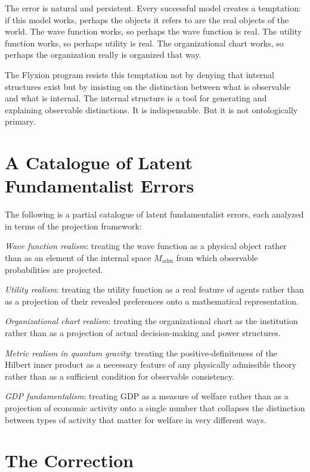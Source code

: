 \documentclass[12pt,a4paper]{book}
\theoremstyle{remark}
\theoremstyle{definition}
\begin{document}
The error is natural and persistent. Every successful model creates a
temptation: if this model works, perhaps the objects it refers to are
the real objects of the world. The wave function works, so perhaps the
wave function is real. The utility function works, so perhaps utility is
real. The organizational chart works, so perhaps the organization really
is organized that way.

The Flyxion program resists this temptation not by denying that internal
structures exist but by insisting on the distinction between what is
observable and what is internal. The internal structure is a tool for
generating and explaining observable distinctions. It is indispensable.
But it is not ontologically primary.

\section{A Catalogue of Latent Fundamentalist Errors}

The following is a partial catalogue of latent fundamentalist errors,
each analyzed in terms of the projection framework:

\textit{Wave function realism}: treating the wave function as a physical
object rather than as an element of the internal space $M_{\mathrm{adm}}$
from which observable probabilities are projected.

\textit{Utility realism}: treating the utility function as a real feature
of agents rather than as a projection of their revealed preferences onto
a mathematical representation.

\textit{Organizational chart realism}: treating the organizational chart
as the institution rather than as a projection of actual decision-making
and power structures.

\textit{Metric realism in quantum gravity}: treating the positive-definiteness
of the Hilbert inner product as a necessary feature of any physically
admissible theory rather than as a sufficient condition for observable
consistency.

\textit{GDP fundamentalism}: treating GDP as a measure of welfare rather
than as a projection of economic activity onto a single number that
collapses the distinction between types of activity that matter for welfare
in very different ways.

\section{The Correction}
\end{document}
